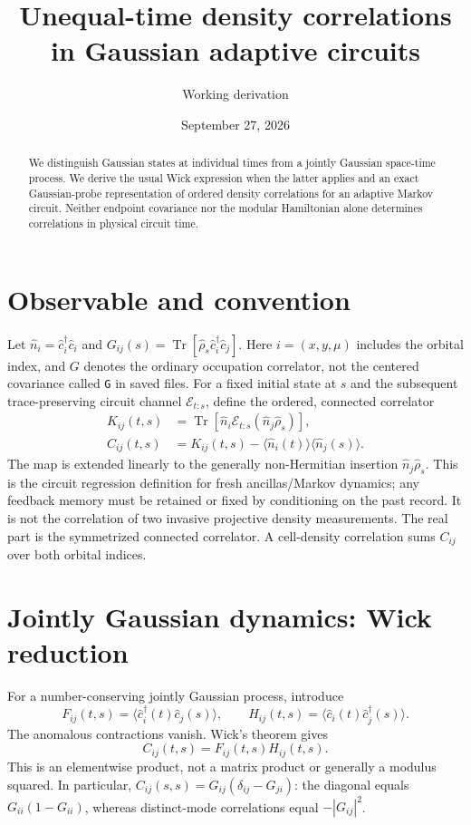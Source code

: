 \documentclass[aps,prb,onecolumn,nofootinbib,superscriptaddress]{revtex4-2}
\begin{document}
\title{Unequal-time density correlations in Gaussian adaptive circuits}
\author{Working derivation}
\date{September 27, 2026}
\begin{abstract}
We distinguish Gaussian states at individual times from a jointly Gaussian
space-time process. We derive the usual Wick expression when the latter applies
and an exact Gaussian-probe representation of ordered density correlations for
an adaptive Markov circuit. Neither endpoint covariance nor the modular
Hamiltonian alone determines correlations in physical circuit time.
\end{abstract}
\maketitle
\setcounter{tocdepth}{2}
\tableofcontents

\section{Observable and convention}
Let $\hat n_i=\hat c_i^\dagger\hat c_i$ and
$G_{ij}(s)=\operatorname{Tr}[\hat\rho_s\hat c_i^\dagger\hat c_j]$.
Here $i=(x,y,\mu)$ includes the orbital index, and $G$ denotes the ordinary
occupation correlator, not the centered covariance called \texttt{G} in saved files.
For a fixed initial state at $s$ and the subsequent trace-preserving circuit
channel $\mathcal E_{t:s}$, define the ordered, connected correlator
\begin{align}
K_{ij}(t,s)&=\operatorname{Tr}\!\left[\hat n_i
  \mathcal E_{t:s}(\hat n_j\hat\rho_s)\right],\\
C_{ij}(t,s)&=K_{ij}(t,s)-\langle\hat n_i(t)\rangle\langle\hat n_j(s)\rangle.
\end{align}
The map is extended linearly to the generally non-Hermitian insertion
$\hat n_j\hat\rho_s$. This is the circuit regression definition for fresh
ancillas/Markov dynamics; any feedback memory must be retained or fixed by
conditioning on the past record. It is not the correlation of two invasive
projective density measurements. The real part is the symmetrized connected
correlator. A cell-density correlation sums $C_{ij}$ over both orbital indices.

\section{Jointly Gaussian dynamics: Wick reduction}
For a number-conserving jointly Gaussian process, introduce
\begin{equation}
F_{ij}(t,s)=\langle\hat c_i^\dagger(t)\hat c_j(s)\rangle,
\qquad H_{ij}(t,s)=\langle\hat c_i(t)\hat c_j^\dagger(s)\rangle.
\end{equation}
The anomalous contractions vanish. Wick's theorem gives
\begin{equation}\boxed{C_{ij}(t,s)=F_{ij}(t,s)H_{ij}(t,s).}\end{equation}
This is an elementwise product, not a matrix product or generally a modulus
squared. In particular,
$C_{ij}(s,s)=G_{ij}(\delta_{ij}-G_{ji})$:
the diagonal equals $G_{ii}(1-G_{ii})$, whereas distinct-mode correlations equal
$-|G_{ij}|^2$.
\end{document}

